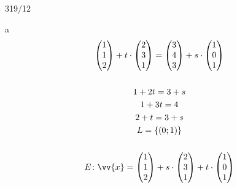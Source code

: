 \begin{exercise}{319/12}
  \item [a]
  \begin{gather*}
    \begin{pmatrix}1 \\ 1 \\ 2\end{pmatrix} + t \cdot \begin{pmatrix}2 \\ 3 \\ 1\end{pmatrix} = \begin{pmatrix}3 \\ 4 \\ 3\end{pmatrix} + s \cdot \begin{pmatrix}1 \\ 0 \\ 1\end{pmatrix} \\\\
    1 + 2t = 3 + s \\
    1 + 3t = 4 \\
    2 + t = 3 + s \\
    L = \{(0; 1)\} \\\\
    E \colon \vv{x} = \begin{pmatrix}1 \\ 1 \\ 2\end{pmatrix} + s \cdot \begin{pmatrix}2 \\ 3 \\ 1\end{pmatrix} + t \cdot \begin{pmatrix}1 \\ 0 \\ 1\end{pmatrix}
  \end{gather*}
\end{exercise}
